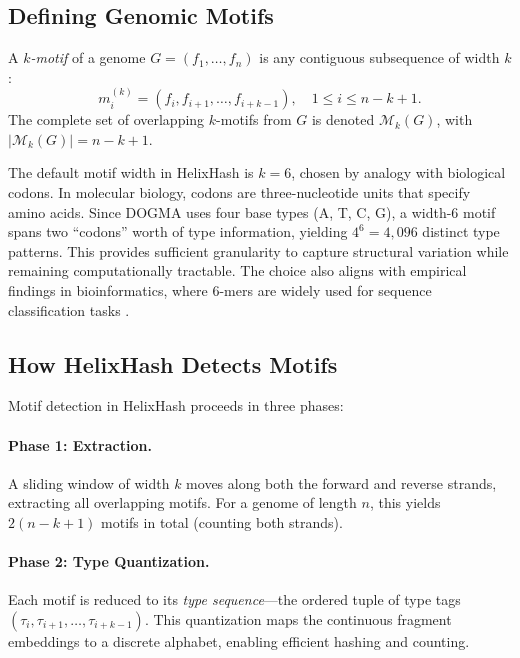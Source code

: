 \subsection{Defining Genomic Motifs}

\begin{definition}
\label{def:motif}
A \emph{$k$-motif} of a genome $G = (f_1, \ldots, f_n)$ is any contiguous subsequence of width $k$:
\begin{equation}
m_i^{(k)} = (f_i, f_{i+1}, \ldots, f_{i+k-1}), \quad 1 \leq i \leq n - k + 1.
\end{equation}
The complete set of overlapping $k$-motifs from $G$ is denoted $\mathcal{M}_k(G)$, with $|\mathcal{M}_k(G)| = n - k + 1$.
\end{definition}

\begin{keyinsight}[Why $k = 6$?]
The default motif width in HelixHash is $k = 6$, chosen by analogy with biological codons. In molecular biology, codons are three-nucleotide units that specify amino acids. Since DOGMA uses four base types (A, T, C, G), a width-6 motif spans two ``codons'' worth of type information, yielding $4^6 = 4{,}096$ distinct type patterns. This provides sufficient granularity to capture structural variation while remaining computationally tractable. The choice also aligns with empirical findings in bioinformatics, where 6-mers are widely used for sequence classification tasks \citep{wood2014}.
\end{keyinsight}

\subsection{How HelixHash Detects Motifs}

Motif detection in HelixHash proceeds in three phases:

\paragraph{Phase 1: Extraction.} A sliding window of width $k$ moves along both the forward and reverse strands, extracting all overlapping motifs. For a genome of length $n$, this yields $2(n - k + 1)$ motifs in total (counting both strands).

\paragraph{Phase 2: Type Quantization.} Each motif is reduced to its \emph{type sequence}---the ordered tuple of type tags $(\tau_i, \tau_{i+1}, \ldots, \tau_{i+k-1})$. This quantization maps the continuous fragment embeddings to a discrete alphabet, enabling efficient hashing and counting.

